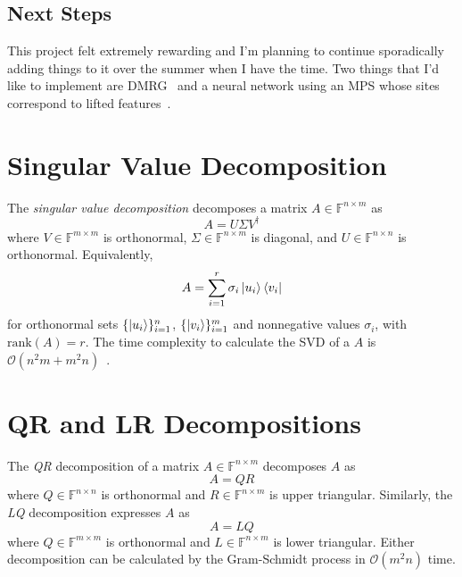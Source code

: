 \documentclass[12pt]{article}
\begin{document}
\begin{multicols}{2}
	\subsection{Next Steps}
	This project felt extremely rewarding and I'm planning to continue
	sporadically adding things to it over the summer when I have the
	time. Two things that I'd like to implement are DMRG~\cite{DMRG}
	and a neural network using an MPS whose sites correspond to lifted
	features~\cite{mps-ml, Huggins}.





\appendix
\section{Singular Value Decomposition}
The \textit{singular value decomposition} decomposes a matrix $A\in\mathds{F}^{n\times m}$ as
\[
	A=U\Sigma V^\dagger
\]
where $V\in \mathds{F}^{m\times m}$ is orthonormal, $\Sigma\in\mathds{F}^{n\times m}$ is diagonal, and $U\in\mathds{F}^{n\times n}$ is orthonormal. Equivalently,
\[
	A=\sum_{i=1}^r\sigma_i\ket{u_i}\bra{v_i}
\]
for orthonormal sets $\{\ket{u_i}\}_{i=1}^n$, $\{\ket{v_i}\}_{i=1}^m$ and nonnegative values $\sigma_i$, with $\text{rank}(A)=r$. The time complexity to calculate the SVD of a $A$ is $\mathcal{O}(n^2m+m^2n)$~\cite{matrix-stuff}.
\section{QR and LR Decompositions}
The \textit{QR} decomposition of a matrix $A\in\mathds{F}^{n\times m}$ decomposes $A$ as
\[
	A=QR
\]
where $Q\in\mathds{F}^{n\times n}$ is orthonormal and $R\in\mathds{F}^{n\times m}$ is upper triangular. Similarly, the \textit{LQ} decomposition expresses $A$ as
\[
	A=LQ
\]
where $Q\in\mathds{F}^{m\times m}$ is orthonormal and $L\in\mathds{F}^{n\times m}$ is lower triangular.
Either decomposition can be calculated by the Gram-Schmidt process in $\mathcal{O}(m^2n)$ time.
\end{multicols}
\end{document}
